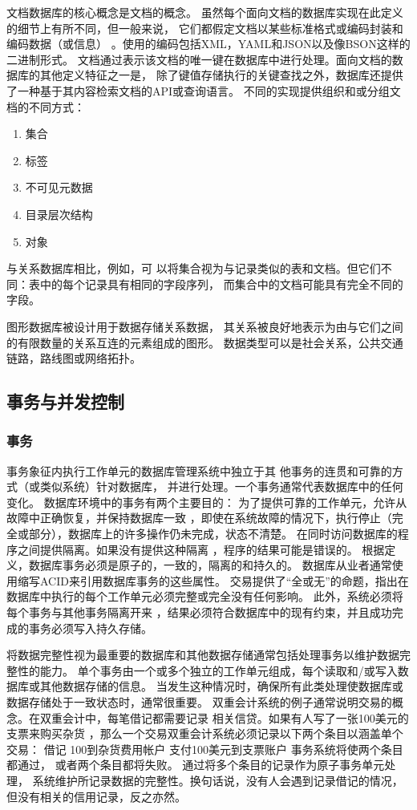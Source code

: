文档数据库的核心概念是文档的概念。
虽然每个面向文档的数据库实现在此定义的细节上有所不同，但一般来说，
它们都假定文档以某些标准格式或编码封装和编码数据（或信息）
。使用的编码包括XML，YAML和JSON以及像BSON这样的二进制形式。
文档通过表示该文档的唯一键在数据库中进行处理。面向文档的数据库的其他定义特征之一是，
除了键值存储执行的关键查找之外，数据库还提供了一种基于其内容检索文档的API或查询语言。
不同的实现提供组织和或分组文档的不同方式：
\begin{enumerate}
	\item 集合
	\item 标签
	\item 不可见元数据
	\item 目录层次结构
	\item 对象
\end{enumerate}
与关系数据库相比，例如，可
以将集合视为与记录类似的表和文档。但它们不同：表中的每个记录具有相同的字段序列，
而集合中的文档可能具有完全不同的字段。

图形数据库被设计用于数据存储关系数据，
其关系被良好地表示为由与它们之间的有限数量的关系互连的元素组成的图形。
数据类型可以是社会关系，公共交通链路，路线图或网络拓扑。
\subsection{事务与并发控制}
\subsubsection{事务}
事务象征内执行工作单元的数据库管理系统中独立于其
他事务的连贯和可靠的方式（或类似系统）针对数据库，
并进行处理。一个事务通常代表数据库中的任何变化。
数据库环境中的事务有两个主要目的：
为了提供可靠的工作单元，允许从故障中正确恢复，并保持数据库一致
，即使在系统故障的情况下，执行停止（完全或部分），数据库上的许多操作仍未完成，状态不清楚。
在同时访问数据库的程序之间提供隔离。如果没有提供这种隔离
，程序的结果可能是错误的。
根据定义，数据库事务必须是原子的，一致的，隔离的和持久的。
数据库从业者通常使用缩写ACID来引用数据库事务的这些属性。
交易提供了“全或无”的命题，指出在数据库中执行的每个工作单元必须完整或完全没有任何影响。
此外，系统必须将每个事务与其他事务隔离开来
，结果必须符合数据库中的现有约束，并且成功完成的事务必须写入持久存储。

将数据完整性视为最重要的数据库和其他数据存储通常包括处理事务以维护数据完整性的能力。
单个事务由一个或多个独立的工作单元组成，每个读取和/或写入数据库或其他数据存储的信息。
当发生这种情况时，确保所有此类处理使数据库或数据存储处于一致状态时，通常很重要。
双重会计系统的例子通常说明交易的概念。在双重会计中，每笔借记都需要记录
相关信贷。如果有人写了一张100美元的支票来购买杂货
，那么一个交易双重会计系统必须记录以下两个条目以涵盖单个交易：
借记 100到杂货费用帐户
支付100美元到支票账户
事务系统将使两个条目都通过，
或者两个条目都将失败。
通过将多个条目的记录作为原子事务单元处理，
系统维护所记录数据的完整性。换句话说，没有人会遇到记录借记的情况，但没有相关的信用记录，反之亦然。
